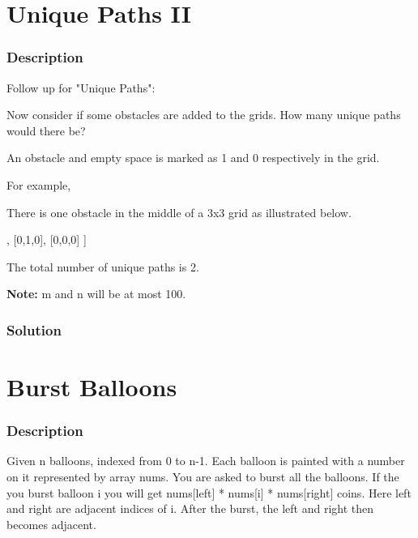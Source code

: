 \begin{Code}

\end{Code}

\newpage

\section{Unique Paths II} %

\subsubsection{Description}
Follow up for "Unique Paths":

Now consider if some obstacles are added to the grids. How many unique paths would there be?

An obstacle and empty space is marked as 1 and 0 respectively in the grid.

For example,

There is one obstacle in the middle of a 3x3 grid as illustrated below.
\begin{Code}
[
  [0,0,0],
  [0,1,0],
  [0,0,0]
]
\end{Code}

The total number of unique paths is 2.

\textbf{Note:} m and n will be at most 100.

\subsubsection{Solution}

\begin{Code}

\end{Code}

\newpage

\section{Burst Balloons} %

\subsubsection{Description}
Given n balloons, indexed from 0 to n-1. Each balloon is painted with a number on it represented by array nums. You are asked to burst all the balloons. If the you burst balloon i you will get nums[left] * nums[i] * nums[right] coins. Here left and right are adjacent indices of i. After the burst, the left and right then becomes adjacent.

